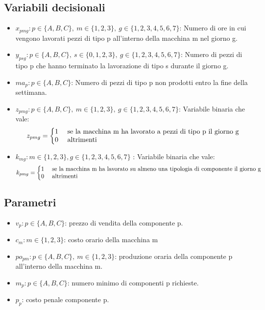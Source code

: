\documentclass[12pt]{article}
\makeatletter
\newenvironment{sistema}%
{\left\lbrace\begin{array}{@{}l@{}}}%
	{\end{array}\right.}
\makeatother
\begin{document}
	\subsection{Variabili decisionali}
	\begin{itemize}
		\item \( x_{pmg} : p \in \{A, B, C\},\ m \in \{1, 2, 3\},\ g \in \{1, 2, 3, 4, 5, 6, 7\}\): Numero di ore in cui vengono lavorati pezzi di tipo p all'interno della macchina m nel giorno g.
		\item \( y_{psg} : p \in \{A, B, C\},\ s \in \{0, 1, 2, 3\},\ g \in \{1, 2, 3, 4, 5, 6, 7\}\): Numero di pezzi di tipo p che hanno terminato la lavorazione di tipo s durante il giorno g.
		\item\(ma_p : p \in \{ A,B,C\} \): Numero di pezzi di tipo p non prodotti entro la fine della settimana.
		\item \( z_{pmg} : p \in \{A, B, C\},\ m \in \{1, 2, 3\},\ g \in \{1, 2, 3, 4, 5, 6, 7\}\): Variabile binaria che vale:
		\[ 
			z_{pmg}=
			\begin{sistema} 
				\textrm{1 \quad se la macchina m ha lavorato a pezzi di tipo p il giorno g}\\
				\textrm{0 \quad altrimenti} \\ 
			\end{sistema} 
		\]
		\item \( k_{mg} : m \in \{1,2,3\}, g \in \{1,2,3,4,5,6,7\} \) : Variabile binaria che vale:
		\[ 
			k_{pmg}=
			\begin{sistema} 
				\textrm{1 \quad se la macchina m  ha lavorato su almeno una tipologia di componente il giorno g}\\
				\textrm{0 \quad altrimenti}
			\end{sistema} 
		\]
	\end{itemize}
	\subsection{Parametri}
	\begin{itemize}
		\item \( v_p : p \in \{A, B, C\} \): prezzo di vendita della componente p.
		\item \( c_m : m \in \{1, 2, 3\} \): costo orario della macchina m
		\item \( po_{pm} : p \in \{A, B, C\},\ m \in \{1, 2, 3\}\): produzione oraria della componente p all'interno della macchina m.
		\item \( m_p : p \in \{A, B, C\}\): numero minimo di componenti p richieste.
		\item \(p_p\): costo penale componente p.
	\end{itemize}
\end{document}
